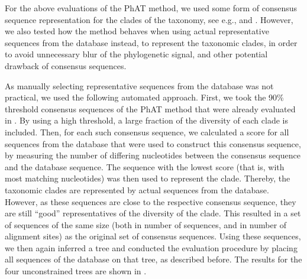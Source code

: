 For the above evaluations of the \ac{PhAT} method,
we used some form of consensus sequence representation for the clades of the taxonomy,
see e.g.,  and .
However, we also tested how the method behaves when using actual representative sequences from the database instead,
to represent the taxonomic clades,
in order to avoid unnecessary blur of the phylogenetic signal, and other potential drawback of consensus sequences.

As manually selecting representative sequences from the database was not practical,
we used the following automated approach.
First, we took the 90\% threshold consensus sequences of the \ac{PhAT} method
that were already evaluated in .
By using a high threshold, a large fraction of the diversity of each clade is included.
Then, for each such consensus sequence,
we calculated a score for all sequences from the database that were used to construct this consensus sequence,
by measuring the number of differing nucleotides between the consensus sequence and the database sequence.
The sequence with the lowest score (that is, with most matching nucleotides)
was then used to represent the clade.
Thereby, the taxonomic clades are represented by actual sequences from the database.
However, as these sequences are close to the respective consensus sequence,
they are still ``good'' representatives of the diversity of the clade.
This resulted in a set of sequences of the same size (both in number of sequences, and in number of alignment sites) 
as the original set of consensus sequences.
Using these sequences, we then again inferred a tree and
conducted the evaluation procedure by placing all sequences of the database on that tree,
as described before.
The results for the four unconstrained trees are shown in .

